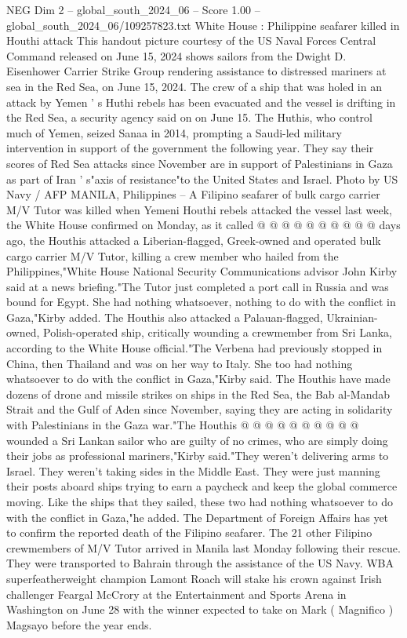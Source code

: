 \begin{textsample}{NEG Dim 2 – global\_south\_2024\_06 – Score 1.00 – global\_south\_2024\_06/109257823.txt}  \label{ex:f2_neg_394}
White House : Philippine seafarer killed in Houthi attack This handout picture courtesy of the US Naval Forces Central Command released on June 15, 2024 shows sailors from the Dwight D.
Eisenhower Carrier Strike Group rendering assistance to distressed mariners at sea in the Red Sea, on June 15, 2024.
The crew of a ship that was holed in an attack by Yemen ' s Huthi rebels has been evacuated and the vessel is drifting in the Red Sea, a security agency said on on June 15.
The Huthis, who control much of Yemen, seized Sanaa in 2014, prompting a Saudi-led military intervention in support of the government the following year.
They say their scores of Red Sea attacks since November are in support of Palestinians in Gaza as part of Iran ' s"axis of resistance"to the United States and Israel.
Photo by US Navy / AFP MANILA, Philippines -- A Filipino seafarer of bulk cargo carrier M/V Tutor was killed when Yemeni Houthi rebels attacked the vessel last week, the White House confirmed on Monday, as it called @ @ @ @ @ @ @ @ @ @ days ago, the Houthis attacked a Liberian-flagged, Greek-owned and operated bulk cargo carrier M/V Tutor, killing a crew member who hailed from the Philippines,"White House National Security Communications advisor John Kirby said at a news briefing."The Tutor just completed a port call in Russia and was bound for Egypt.
She had nothing whatsoever, nothing to do with the conflict in Gaza,"Kirby added.
The Houthis also attacked a Palauan-flagged, Ukrainian-owned, Polish-operated ship, critically wounding a crewmember from Sri Lanka, according to the White House official."The Verbena had previously stopped in China, then Thailand and was on her way to Italy.
She too had nothing whatsoever to do with the conflict in Gaza,"Kirby said.
The Houthis have made dozens of drone and missile strikes on ships in the Red Sea, the Bab al-Mandab Strait and the Gulf of Aden since November, saying they are acting in solidarity with Palestinians in the Gaza war."The Houthis @ @ @ @ @ @ @ @ @ @ wounded a Sri Lankan sailor who are guilty of no crimes, who are simply doing their jobs as professional mariners,"Kirby said."They weren't delivering arms to Israel.
They weren't taking sides in the Middle East.
They were just manning their posts aboard ships trying to earn a paycheck and keep the global commerce moving.
Like the ships that they sailed, these two had nothing whatsoever to do with the conflict in Gaza,"he added.
The Department of Foreign Affairs has yet to confirm the reported death of the Filipino seafarer.
The 21 other Filipino crewmembers of M/V Tutor arrived in Manila last Monday following their rescue.
They were transported to Bahrain through the assistance of the US Navy.
WBA superfeatherweight champion Lamont Roach will stake his crown against Irish challenger Feargal McCrory at the Entertainment and Sports Arena in Washington on June 28 with the winner expected to take on Mark ( Magnifico ) Magsayo before the year ends.

\end{textsample}
